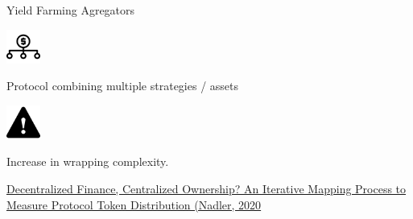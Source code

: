 \documentclass[handout]{beamer}
\begin{document}
\begin{frame}{Yield Farming Agregators}



		\begin{minipage}{0.2\textwidth}
			\begin{center}
				\includegraphics[height=3em]{../assets/images/diversification.png}
			\end{center}
		\end{minipage}
		\hspace{1 em}
		\begin{minipage}{0.72\textwidth}
		Protocol combining multiple strategies / assets 
		\end{minipage}
		\pause
		\vspace{2 em}
		
		\begin{minipage}{0.2\textwidth}
			\begin{center}
				\includegraphics[height=3em]{../assets/images/warning.png}
			\end{center}
		\end{minipage}
		\hspace{1 em}
		\begin{minipage}{0.72\textwidth}
		Increase in wrapping complexity. 
		\end{minipage}
		\pause
		\vspace{3 em}			
		
		
			\link \href{https://arxiv.org/pdf/2012.09306}{Decentralized Finance, Centralized Ownership? An Iterative Mapping Process to Measure Protocol Token Distribution (Nadler, 2020}

\end{frame}
\end{document}
